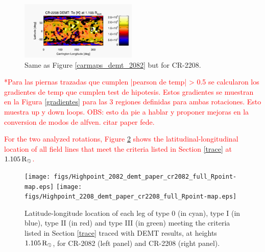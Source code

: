 \documentclass[namedreferences]{solarphysics}
\newcommand{\mrsun}{{\rm R_\odot}}
\begin{document}
\begin{article}
\begin{figure}[h!]
\begin{center}
\includegraphics[width=0.495\textwidth]{figs/map_Tm_CR2208_DEMT-AIA_H1_L522_r3d_1105_Rsun.pdf}
\caption{Same as Figure \ref{carmaps_demt_2082} but for CR-2208.}
\label{carmaps_demt_2208}
\end{center}
\end{figure}

\textcolor{red}{
*Para las piernas trazadas que cumplen  |pearson de temp| > 0.5 se calcularon los gradientes de temp que cumplen test de hipotesis. Estos gradientes se muestran en la Figura \ref{gradientes} para las 3 regiones definidas para ambas rotaciones. Esto muestra up y down loops.
OBS: esto da pie a hablar y proponer mejoras en la conversion de modos de alfven. citar paper fede.
}

\textcolor{red}{
For the two analyzed rotations, Figure \ref{rpoint_demt} shows the latitudinal-longitudinal location of all field lines that meet the criteria listed in Section \ref{trace} at $1.105\,\mrsun$.
}

\begin{figure}[h!]
\begin{center}
\texttt{[image: figs/Highpoint\_2082\_demt\_paper\_cr2082\_full\_Rpoint-map.eps]}
\texttt{[image: figs/Highpoint\_2208\_demt\_paper\_cr2208\_full\_Rpoint-map.eps]}
\caption{Latitude-longitude location of each leg of type 0 (in cyan), type I (in blue), type II (in red) and type III (in green) meeting the criteria listed in Section \ref{trace} traced with DEMT results, at heights $1.105\,\mrsun$, for CR-2082 (left panel) and CR-2208 (right panel).}
\label{rpoint_demt}
\end{center}
\end{figure} 


\end{article}
\end{document}
